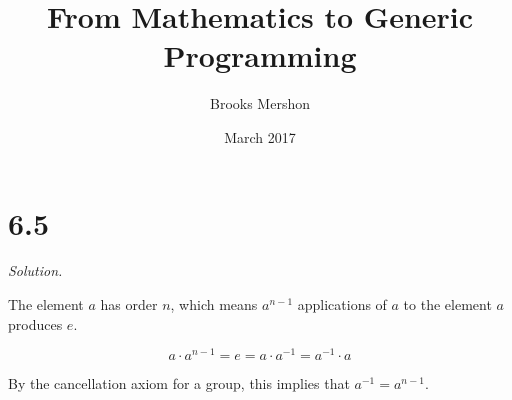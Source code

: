 \documentclass{article}
\title{From Mathematics to Generic Programming}
\author{Brooks Mershon}
\date{March 2017}
\begin{document}
\maketitle

\section*{6.5}

\textit{Solution.}

The element $a$ has order $n$, which means $a^{n-1}$ applications of $a$ to the element $a$ produces $e$.

$$a \cdot a^{n-1} = e = a \cdot a^{-1} = a^{-1} \cdot a$$

By the cancellation axiom for a group, this implies that $a^{-1} = a^{n-1}$.
\end{document}
